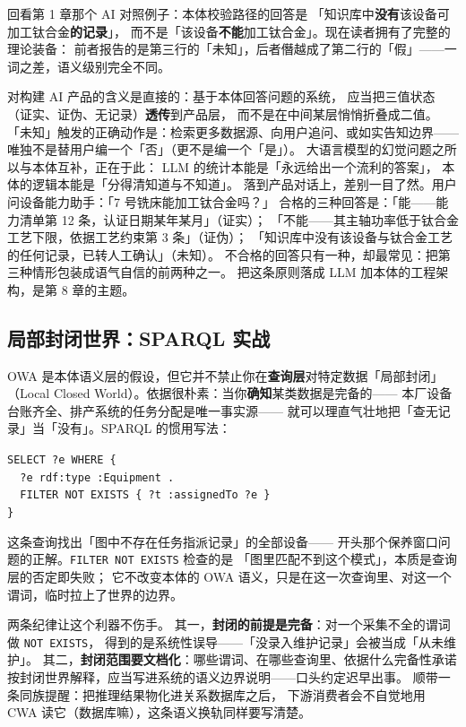 回看第 1 章那个 AI 对照例子：本体校验路径的回答是
「知识库中\textbf{没有}该设备可加工钛合金\textbf{的记录}」，
而不是「该设备\textbf{不能}加工钛合金」。现在读者拥有了完整的理论装备：
前者报告的是第三行的「未知」，后者僭越成了第二行的「假」——一词之差，语义级别完全不同。

对构建 AI 产品的含义是直接的：基于本体回答问题的系统，
应当把三值状态（证实、证伪、无记录）\textbf{透传}到产品层，
而不是在中间某层悄悄折叠成二值。
「未知」触发的正确动作是：检索更多数据源、向用户追问、或如实告知边界——
唯独不是替用户编一个「否」（更不是编一个「是」）。
大语言模型的幻觉问题之所以与本体互补，正在于此：
LLM 的统计本能是「永远给出一个流利的答案」，
本体的逻辑本能是「分得清知道与不知道」。
落到产品对话上，差别一目了然。用户问设备能力助手：「7 号铣床能加工钛合金吗？」
合格的三种回答是：「能——能力清单第 12 条，认证日期某年某月」（证实）；
「不能——其主轴功率低于钛合金工艺下限，依据工艺约束第 3 条」（证伪）；
「知识库中没有该设备与钛合金工艺的任何记录，已转人工确认」（未知）。
不合格的回答只有一种，却最常见：把第三种情形包装成语气自信的前两种之一。
把这条原则落成 LLM 加本体的工程架构，是第 8 章的主题。

\subsection{局部封闭世界：SPARQL 实战}

OWA 是本体语义层的假设，但它并不禁止你在\textbf{查询层}对特定数据「局部封闭」
（Local Closed World）。依据很朴素：当你\textbf{确知}某类数据是完备的——
本厂设备台账齐全、排产系统的任务分配是唯一事实源——
就可以理直气壮地把「查无记录」当「没有」。SPARQL 的惯用写法：

\begin{noteblock}
\texttt{SELECT ?e WHERE \{}\\
\texttt{\ \ ?e rdf:type :Equipment .}\\
\texttt{\ \ FILTER NOT EXISTS \{ ?t :assignedTo ?e \}}\\
\texttt{\}}
\end{noteblock}

这条查询找出「图中不存在任务指派记录」的全部设备——
开头那个保养窗口问题的正解。\texttt{FILTER NOT EXISTS} 检查的是
「图里匹配不到这个模式」，本质是查询层的否定即失败；
它不改变本体的 OWA 语义，只是在这一次查询里、对这一个谓词，临时拉上了世界的边界。

两条纪律让这个利器不伤手。
其一，\textbf{封闭的前提是完备}：对一个采集不全的谓词做 \texttt{NOT EXISTS}，
得到的是系统性误导——「没录入维护记录」会被当成「从未维护」。
其二，\textbf{封闭范围要文档化}：哪些谓词、在哪些查询里、依据什么完备性承诺
按封闭世界解释，应当写进系统的语义边界说明——口头约定迟早出事。
顺带一条同族提醒：把推理结果物化进关系数据库之后，
下游消费者会不自觉地用 CWA 读它（数据库嘛），这条语义换轨同样要写清楚。

